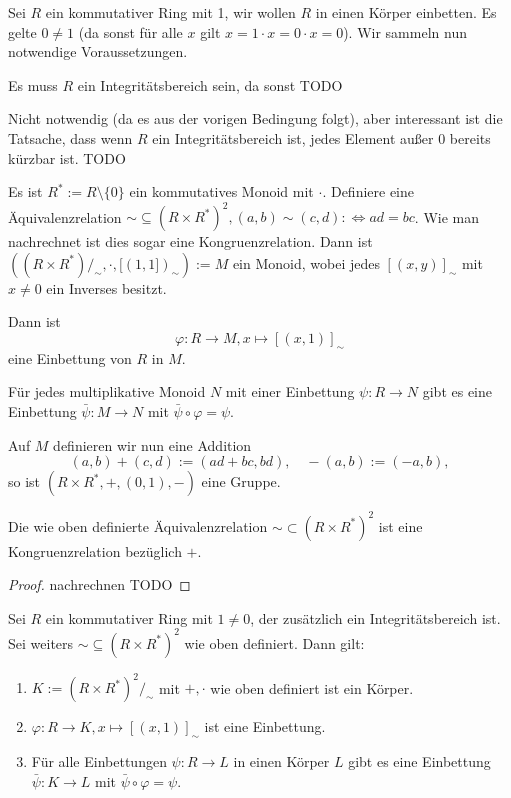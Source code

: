 \begin{remark}
    Sei $R$ ein kommutativer Ring mit 1, wir wollen $R$ in einen Körper einbetten. Es gelte \obda $0 \neq 1$ (da sonst für alle $x$ gilt $ x = 1\cdot x = 0 \cdot x = 0$). Wir sammeln nun notwendige Voraussetzungen.

    Es muss $R$ ein Integritätsbereich sein, da sonst
    TODO

    Nicht notwendig (da es aus der vorigen Bedingung folgt), aber interessant ist die Tatsache, dass wenn $R$ ein Integritätsbereich ist, jedes Element außer $0$ bereits kürzbar ist.
    TODO

    Es ist $R^* := R \setminus \{0\}$ ein kommutatives Monoid mit $\cdot$. Definiere eine Äquivalenzrelation $\sim \subseteq (R \times R^*)^2, (a, b) \sim (c, d) :\Leftrightarrow ad = bc$. Wie man nachrechnet ist dies sogar eine Kongruenzrelation. Dann ist $((R \times R^*)/_\sim, \cdot, [(1,1])_\sim) := M$ ein Monoid, wobei jedes $[(x,y)]_\sim$ mit $x \neq 0$ ein Inverses besitzt.
    
    Dann ist
    $$ \varphi : R \to M, x \mapsto [(x, 1)]_\sim $$
    eine Einbettung von $R$ in $M$.

    Für jedes multiplikative Monoid $N$ mit einer Einbettung $\psi : R \to N$ gibt es eine Einbettung $\bar{\psi} : M \to N$ mit $\bar{\psi} \circ \varphi = \psi$.

    Auf $M$ definieren wir nun eine Addition
    $$ (a,b) + (c,d) := (ad+bc, bd), \quad -(a,b) := (-a, b), $$
    so ist $(R \times R^*, +, (0,1), -)$ eine Gruppe.
\end{remark}

\begin{lemma}
    Die wie oben definierte Äquivalenzrelation $\sim \subset (R \times R^*)^2$ ist eine Kongruenzrelation bezüglich $+$.
\end{lemma}

\begin{proof}
    nachrechnen TODO
\end{proof}

\begin{theorem}
    Sei $R$ ein kommutativer Ring mit $1 \neq 0$, der zusätzlich ein Integritätsbereich ist. Sei weiters $\sim \subseteq (R \times R^*)^2$ wie oben definiert. Dann gilt:
    \begin{enumerate}
        \item $K := (R \times R^*)^2/_\sim $ mit $+, \cdot$ wie oben definiert ist ein Körper.
        \item $\varphi : R \to K, x \mapsto [(x, 1)]_\sim$ ist eine Einbettung.
        \item Für alle Einbettungen $\psi : R \to L$ in einen Körper $L$ gibt es eine Einbettung $\bar{\psi} : K \to L$ mit $\bar{\psi} \circ \varphi = \psi$.
    \end{enumerate}
\end{theorem}

